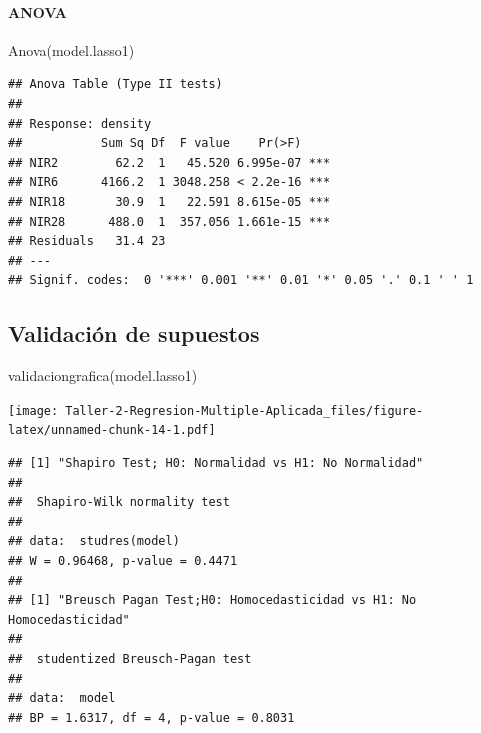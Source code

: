 \documentclass[
]{article}
\newenvironment{Shaded}{\begin{snugshade}}{\end{snugshade}}
\newcommand{\FunctionTok}[1]{\textcolor[rgb]{0.00,0.00,0.00}{#1}}
\newcommand{\NormalTok}[1]{#1}
\begin{document}
\hypertarget{anova}{%
\paragraph{ANOVA}\label{anova}}

\begin{Shaded}
\begin{Highlighting}[]
\FunctionTok{Anova}\NormalTok{(model.lasso1)}
\end{Highlighting}
\end{Shaded}

\begin{verbatim}
## Anova Table (Type II tests)
## 
## Response: density
##           Sum Sq Df  F value    Pr(>F)    
## NIR2        62.2  1   45.520 6.995e-07 ***
## NIR6      4166.2  1 3048.258 < 2.2e-16 ***
## NIR18       30.9  1   22.591 8.615e-05 ***
## NIR28      488.0  1  357.056 1.661e-15 ***
## Residuals   31.4 23                       
## ---
## Signif. codes:  0 '***' 0.001 '**' 0.01 '*' 0.05 '.' 0.1 ' ' 1
\end{verbatim}

\hypertarget{validaciuxf3n-de-supuestos}{%
\subsection{Validación de supuestos}\label{validaciuxf3n-de-supuestos}}

\begin{Shaded}
\begin{Highlighting}[]
\FunctionTok{validaciongrafica}\NormalTok{(model.lasso1)}
\end{Highlighting}
\end{Shaded}

\texttt{[image: Taller-2-Regresion-Multiple-Aplicada\_files/figure-latex/unnamed-chunk-14-1.pdf]}

\begin{verbatim}
## [1] "Shapiro Test; H0: Normalidad vs H1: No Normalidad"
## 
##  Shapiro-Wilk normality test
## 
## data:  studres(model)
## W = 0.96468, p-value = 0.4471
## 
## [1] "Breusch Pagan Test;H0: Homocedasticidad vs H1: No Homocedasticidad"
## 
##  studentized Breusch-Pagan test
## 
## data:  model
## BP = 1.6317, df = 4, p-value = 0.8031
\end{verbatim}
\end{document}
